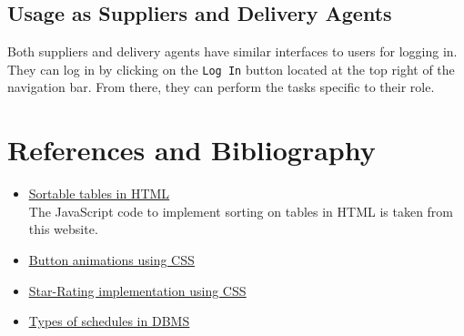 \documentclass[12pt]{report}
\begin{document}
    \subsection*{Usage as Suppliers and Delivery Agents}
    Both suppliers and delivery agents have similar interfaces to users for logging in.
    They can log in by clicking on the \texttt{Log In} button located at the top right of the navigation bar.
    From there, they can perform the tasks specific to their role.

    \vfill \pagebreak

    \section*{References and Bibliography}

    \begin{itemize}
        \item \href{https://mdbootstrap.com/docs/b4/jquery/tables/sort/}{\color{blue}\underline{Sortable tables in HTML}} \\
        The JavaScript code to implement sorting on tables in HTML is taken from this website.
        \item \href{https://www.w3schools.com/howto/howto_css_animate_buttons.asp}{\color{blue}\underline{Button animations using CSS}}
        \item \href{https://codepen.io/hesguru/pen/BaybqXv}{\color{blue}\underline{Star-Rating implementation using CSS}}
        \item \href{https://www.geeksforgeeks.org/types-of-schedules-in-dbms/}{\color{blue}\underline{Types of schedules in DBMS}}
    \end{itemize}
\end{document}
